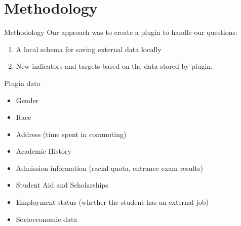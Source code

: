 \section{Methodology}

\begin{frame}{Methodology}
    Our approach was to create a plugin to handle our questions:

    \begin{enumerate}
        \item A local schema for saving external data locally
        \item New indicators and targets based on the data stored by plugin.
    \end{enumerate}

\end{frame}

\begin{frame}{Plugin data}
    \begin{itemize}[<+-|alert@+>]\color{gray}
        \item Gender
        \item Race
        \item Address (time spent in commuting)
        \item Academic History
        \item Admission information (racial quota, entrance exam results)
        \item Student Aid and Scholarships
        \item Employment status (whether the student has an external job)
        \item Socioeconomic data
    \end{itemize}
\end{frame}


